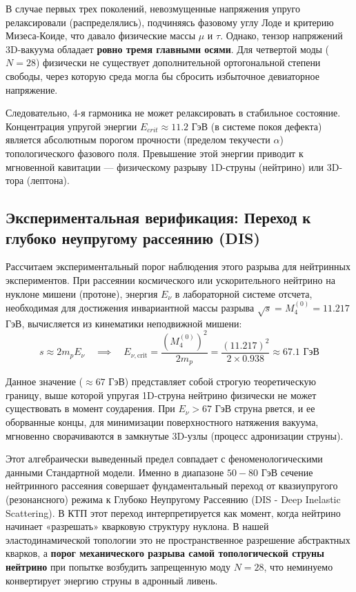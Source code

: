 \documentclass[12pt,a4paper]{article}
\begin{document}
	В случае первых трех поколений, невозмущенные напряжения упруго релаксировали (распределялись), подчиняясь фазовому углу Лоде и критерию Мизеса-Коиде, что давало физические массы $\mu$ и $\tau$. Однако, тензор напряжений 3D-вакуума обладает \textbf{ровно тремя главными осями}. Для четвертой моды ($N=28$) физически не существует дополнительной ортогональной степени свободы, через которую среда могла бы сбросить избыточное девиаторное напряжение. 
	
	Следовательно, 4-я гармоника не может релаксировать в стабильное состояние. Концентрация упругой энергии $E_{crit} \approx 11.2$ ГэВ (в системе покоя дефекта) является абсолютным порогом прочности (пределом текучести $\alpha$) топологического фазового поля. Превышение этой энергии приводит к мгновенной кавитации — физическому разрыву 1D-струны (нейтрино) или 3D-тора (лептона).
	
	\subsection{Экспериментальная верификация: Переход к глубоко неупругому рассеянию (DIS)}
	Рассчитаем экспериментальный порог наблюдения этого разрыва для нейтринных экспериментов. При рассеянии космического или ускорительного нейтрино на нуклоне мишени (протоне), энергия $E_\nu$ в лабораторной системе отсчета, необходимая для достижения инвариантной массы разрыва $\sqrt{s} = M_4^{(0)} = 11.217$ ГэВ, вычисляется из кинематики неподвижной мишени:
	\begin{equation}
		s \approx 2 m_p E_\nu \quad \implies \quad E_{\nu, \text{crit}} = \frac{(M_4^{(0)})^2}{2 m_p} = \frac{(11.217)^2}{2 \times 0.938} \approx \mathbf{67.1 \text{ ГэВ}}
	\end{equation}
	
	Данное значение ($\approx 67$ ГэВ) представляет собой строгую теоретическую границу, выше которой упругая 1D-струна нейтрино физически не может существовать в момент соударения. При $E_\nu > 67$ ГэВ струна рвется, и ее оборванные концы, для минимизации поверхностного натяжения вакуума, мгновенно сворачиваются в замкнутые 3D-узлы (процесс адронизации струны).
	
	Этот алгебраически выведенный предел совпадает с феноменологическими данными Стандартной модели. Именно в диапазоне $50 - 80$ ГэВ сечение нейтринного рассеяния совершает фундаментальный переход от квазиупругого (резонансного) режима к Глубоко Неупругому Рассеянию (DIS - Deep Inelastic Scattering). В КТП этот переход интерпретируется как момент, когда нейтрино начинает «разрешать» кварковую структуру нуклона. В нашей эластодинамической топологии это не пространственное разрешение абстрактных кварков, а \textbf{порог механического разрыва самой топологической струны нейтрино} при попытке возбудить запрещенную моду $N=28$, что неминуемо конвертирует энергию струны в адронный ливень.
	
\end{document}
